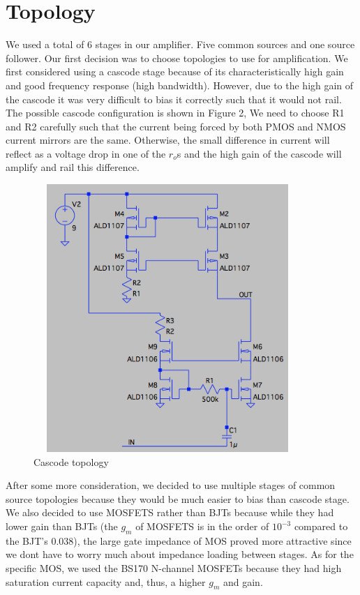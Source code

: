 \documentclass[11pt, twoside, letterpaper]{article}
\begin{document}
\section{Topology}
We used a total of 6 stages in our amplifier. Five common sources and one source follower.
Our first decision was to choose topologies to use for amplification. We first considered using a cascode stage because of 
its characteristically high gain and good frequency response (high bandwidth). However, due to the high gain of the cascode
it was very difficult to bias it correctly such that it would not rail. The possible cascode configuration is shown in Figure 2,
We need to choose R1 and R2 carefully such that the current being forced by both PMOS and NMOS current mirrors are the same.
Otherwise, the small difference in current will reflect as a voltage drop in one of the $r_o$s and the high gain of the cascode
will amplify and rail this difference.
\begin{figure}[htbp]
\begin{center}
\includegraphics[width=4in,height=4in]{Cascode.png}
\caption{Cascode topology}
\end{center}
\end{figure}

After some more consideration, we decided to use multiple stages of common source topologies because they would be much easier to 
bias than cascode stage. We also decided to use MOSFETS rather than BJTs because while they had lower gain than BJTs (the $g_m$ of MOSFETS
is in the order of $10^{-3}$ compared to the BJT's $0.038$), the large gate impedance of MOS proved more attractive since we dont have to
worry much about impedance loading between stages. As for the specific MOS, we used the BS170 N-channel MOSFETs because they had high saturation
current capacity and, thus, a higher $g_m$ and gain.
\end{document}
